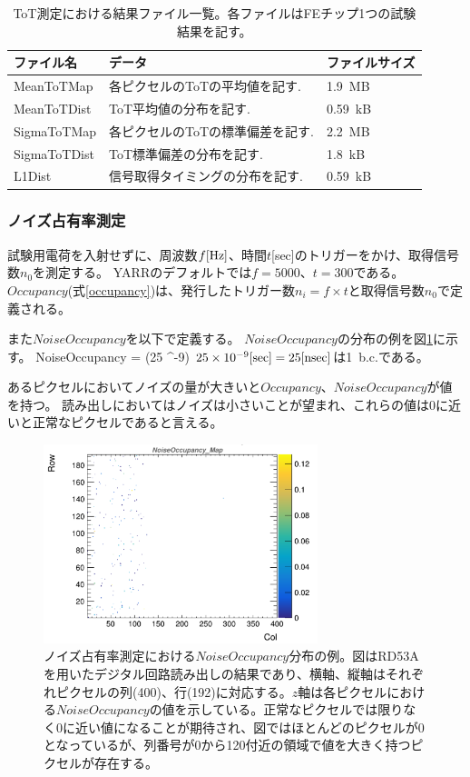 \begin{table}[tbp]
\begin{center}
\caption[ToT測定における結果ファイル一覧]{ToT測定における結果ファイル一覧。各ファイルはFEチップ1つの試験結果を記す。}
\label{tot_result_files}
  \small
  \begin{tabular}{|lll|} \hline
    ファイル名 & データ & ファイルサイズ \\ \hline
    MeanToTMap   & 各ピクセルのToTの平均値を記す.   & 1.9~MB \\ 
    MeanToTDist  & ToT平均値の分布を記す.           & 0.59~kB \\ 
    SigmaToTMap  & 各ピクセルのToTの標準偏差を記す. & 2.2~MB \\ 
    SigmaToTDist & ToT標準偏差の分布を記す.         & 1.8~kB \\ 
    L1Dist       & 信号取得タイミングの分布を記す.  & 0.59~kB \\ \hline 
  \end{tabular}
\end{center}
\end{table}

\subsubsection{ノイズ占有率測定}
試験用電荷を入射せずに、周波数$f[{\rm Hz}]$、時間$t$[sec]のトリガーをかけ、取得信号数$n_0$を測定する。
YARRのデフォルトでは$f=5000、t=300$である。
$Occupancy$(式\ref{occupancy})は、発行したトリガー数$n_i=f \times t$と取得信号数$n_0$で定義される。

また$NoiseOccupancy$を以下で定義する。
$NoiseOccupancy$の分布の例を図\ref{noise_occ}に示す。
\bbb
NoiseOccupancy =  \times (25 ^{-9})
\eee
$25 \times 10^{-9}[{\rm sec}]=25[{\rm nsec}]$は1~b.c.である。

あるピクセルにおいてノイズの量が大きいと$Occupancy$、$NoiseOccupancy$が値を持つ。
読み出しにおいてはノイズは小さいことが望まれ、これらの値は0に近いと正常なピクセルであると言える。

\begin{figure}[bpt]\centering
\includegraphics[width=8cm]{./noise_occ.png}
\caption[ノイズ占有率測定における$NoiseOccupancy$分布の例]{ノイズ占有率測定における$NoiseOccupancy$分布の例。図はRD53Aを用いたデジタル回路読み出しの結果であり、横軸、縦軸はそれぞれピクセルの列(400)、行(192)に対応する。$z$軸は各ピクセルにおける$NoiseOccupancy$の値を示している。正常なピクセルでは限りなく0に近い値になることが期待され、図ではほとんどのピクセルが0となっているが、列番号が0から120付近の領域で値を大きく持つピクセルが存在する。}
\label{noise_occ}
\end{figure}

